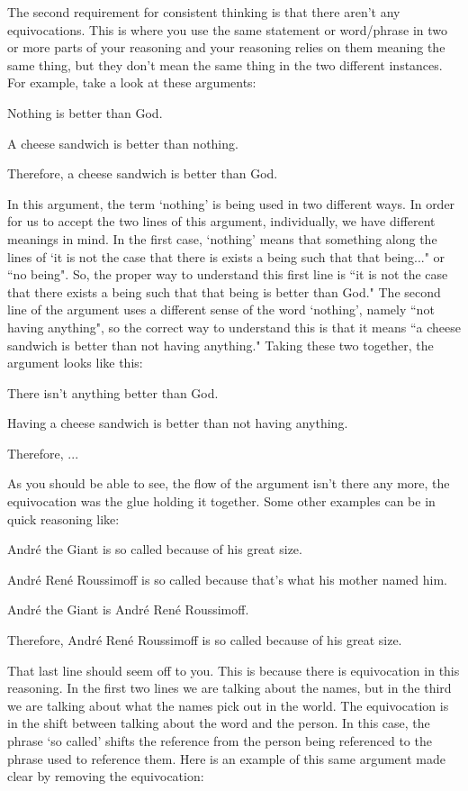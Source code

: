 The second requirement for consistent thinking is that there aren't any equivocations. This is where you use the same statement or word/phrase in two or more parts of your reasoning and your reasoning relies on them meaning the same thing, but they don't mean the same thing in the two different instances. For example, take a look at these arguments:
\begin{earg}
   \item[] Nothing is better than God.
    \item[]A cheese sandwich is better than nothing.
    \item[]Therefore, a cheese sandwich is better than God.
\end{earg}
In this argument, the term `nothing' is being used in two different ways. In order for us to accept the two lines of this argument, individually, we have different meanings in mind. In the first case, `nothing' means that something along the lines of `it is not the case that there is exists a being such that that being..." or ``no being". So, the proper way to understand this first line is ``it is not the case that there exists a being such that that being is better than God." The second line of the argument uses a different sense of the word `nothing', namely ``not having anything", so the correct way to understand this is that it means ``a cheese sandwich is better than not having anything." Taking these two together, the argument looks like this:
\begin{earg}
    \item[]There isn't anything better than God.
    \item[]Having a cheese sandwich is better than not having anything.
    \item[]Therefore, ...
\end{earg}
As you should be able to see, the flow of the argument isn't there any more, the equivocation was the glue holding it together. Some other examples can be in quick reasoning like:
\begin{earg}
    \item[]André the Giant is so called because of his great size.
    \item[]André René Roussimoff is so called because that's what his mother named him.
    \item[]André the Giant is André René Roussimoff.
    \item[]Therefore, André René Roussimoff is so called because of his great size.
\end{earg}
That last line should seem off to you. This is because there is equivocation in this reasoning. In the first two lines we are talking about the names, but in the third we are talking about what the names pick out in the world. The equivocation is in the shift between talking about the word and the person. In this case, the phrase `so called' shifts the reference from the person being referenced to the phrase used to reference them. Here is an example of this same argument made clear by removing the equivocation: 

